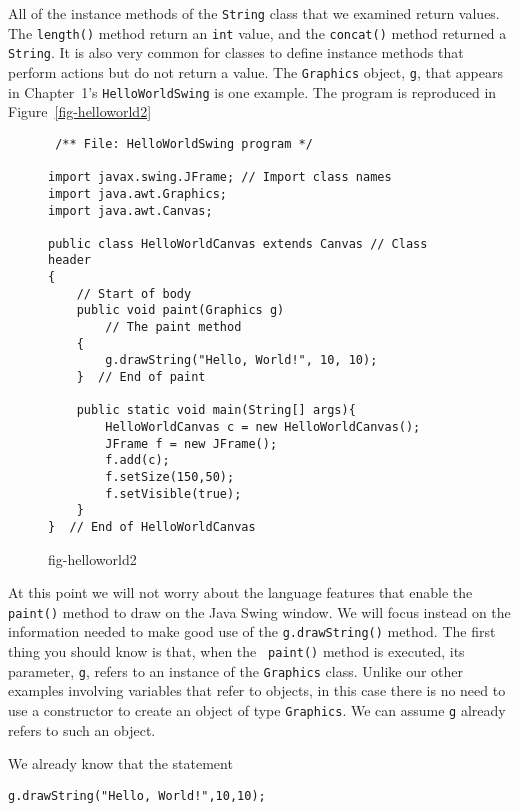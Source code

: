 All of the instance methods of the {\tt String} class that we examined
return values. The {\tt length()} method return an {\tt int} value,
and the {\tt concat()} method returned a {\tt String}.  It is also
very common for classes to define instance methods that perform
actions but do not return a value. The {\tt Graphics} object, {\tt g},
that appears in Chapter~1's {\tt HelloWorldSwing} is one
example. The program is reproduced in Figure~\ref{fig-helloworld2}
\begin{figure}[h!]
\jjjprogstart
\begin{jjjlisting}
\begin{lstlisting}
 /** File: HelloWorldSwing program */

import javax.swing.JFrame; // Import class names
import java.awt.Graphics;
import java.awt.Canvas;

public class HelloWorldCanvas extends Canvas // Class header
{                                            
    // Start of body
    public void paint(Graphics g)           
        // The paint method
    {
        g.drawString("Hello, World!", 10, 10);
    }  // End of paint

    public static void main(String[] args){
        HelloWorldCanvas c = new HelloWorldCanvas();
        JFrame f = new JFrame();
        f.add(c);
        f.setSize(150,50);
        f.setVisible(true);
    }
}  // End of HelloWorldCanvas

\end{lstlisting}
\end{jjjlisting}
{fig-helloworld2}
\end{figure}

At this point we will not worry about the language features that
enable the {\tt paint()} method to draw on the Java Swing window.  
We will focus instead on the
information needed to make good use of the {\tt g.drawString()}
method.  The first thing you should know is that, when the {\tt
paint()} method is executed, its parameter, {\tt g}, refers to an
instance of the {\tt Graphics} class. Unlike our other examples
involving variables that refer to objects, in this case there is no need to use a
constructor to create an object of type {\tt Graphics}. We can assume
{\tt g} already refers to such an object.

We already know that the statement

\begin{jjjlisting}
\begin{lstlisting} 
g.drawString("Hello, World!",10,10);   
\end{lstlisting}
\end{jjjlisting}

